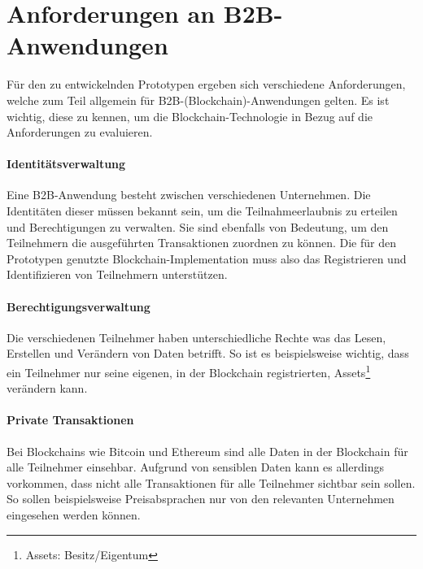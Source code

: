 \section{Anforderungen an B2B-Anwendungen}
\label{sec:general-requirements}
Für den zu entwickelnden Prototypen ergeben sich verschiedene Anforderungen, welche zum Teil allgemein für \acs{B2B}-(Blockchain)-Anwendungen gelten. Es ist wichtig, diese zu kennen, um die Blockchain-Technologie in Bezug auf die Anforderungen zu evaluieren.

\paragraph{Identitätsverwaltung}
Eine \acs{B2B}-Anwendung besteht zwischen verschiedenen Unternehmen. Die Identitäten dieser müssen bekannt sein, um die Teilnahmeerlaubnis zu erteilen und Berechtigungen zu verwalten. Sie sind ebenfalls von Bedeutung, um den Teilnehmern die ausgeführten Transaktionen zuordnen zu können. Die für den Prototypen genutzte Blockchain-Implementation muss also das Registrieren und Identifizieren von Teilnehmern unterstützen.

\paragraph{Berechtigungsverwaltung}
Die verschiedenen Teilnehmer haben unterschiedliche Rechte was das Lesen, Erstellen und Verändern von Daten betrifft. So ist es beispielsweise wichtig, dass ein Teilnehmer nur seine eigenen, in der Blockchain registrierten, Assets\footnote{Assets: Besitz/Eigentum} verändern kann.

\paragraph{Private Transaktionen}
Bei Blockchains wie Bitcoin und Ethereum sind alle Daten in der Blockchain für alle Teilnehmer einsehbar. Aufgrund von sensiblen Daten kann es allerdings vorkommen, dass nicht alle Transaktionen für alle Teilnehmer sichtbar sein sollen. So sollen beispielsweise Preisabsprachen nur von den relevanten Unternehmen eingesehen werden können.

